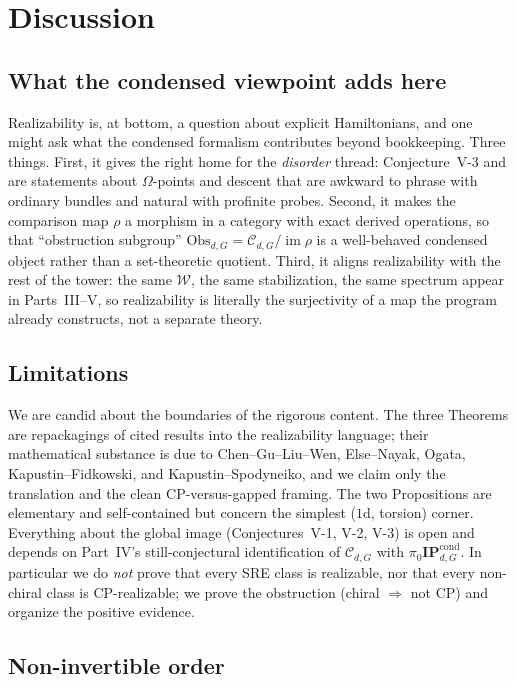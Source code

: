 \documentclass[12pt]{article}
\newcommand{\Weq}{\mathcal{W}}                 %
\newcommand{\IPcond}{\mathbf{IP}^{\mathrm{cond}}}  %
\newcommand{\dis}{\Omega}                       %
\newcommand{\real}{\rho}                         %
\newcommand{\CP}{\mathrm{CP}}                    %
\newcommand{\im}{\operatorname{im}}
\theoremstyle{definition}
\theoremstyle{remark}
\begin{document}
\section{Discussion}
\label{sec:discussion}

\subsection{What the condensed viewpoint adds here}

Realizability is, at bottom, a question about explicit Hamiltonians, and one might ask what
the condensed formalism contributes beyond bookkeeping. Three things. First, it gives the
right home for the \emph{disorder} thread: Conjecture~V-3 and  are
statements about $\dis$-points and descent that are awkward to phrase with ordinary bundles
and natural with profinite probes. Second, it makes the comparison map $\real$ a morphism in
a category with exact derived operations, so that ``obstruction subgroup''
$\mathrm{Obs}_{d,G}=\mathcal{C}_{d,G}/\im\real$ is a well-behaved condensed object rather
than a set-theoretic quotient. Third, it aligns realizability with the rest of the tower: the
same $\Weq$, the same stabilization, the same spectrum appear in Parts~III--V, so
realizability is literally the surjectivity of a map the program already constructs, not a
separate theory.

\subsection{Limitations}

We are candid about the boundaries of the rigorous content. The three Theorems are
repackagings of cited results into the realizability language; their mathematical substance
is due to Chen--Gu--Liu--Wen, Else--Nayak, Ogata, Kapustin--Fidkowski, and
Kapustin--Spodyneiko, and we claim only the translation and the clean $\CP$-versus-gapped
framing. The two Propositions are
elementary and self-contained but concern the simplest ($1$d, torsion) corner. Everything
about the global image (Conjectures~V-1, V-2, V-3) is open and depends on Part~IV's
still-conjectural identification of $\mathcal{C}_{d,G}$ with $\pi_0\IPcond_{d,G}$. In
particular we do \emph{not} prove that every SRE class is realizable, nor that every
non-chiral class is $\CP$-realizable; we prove the obstruction (chiral $\Rightarrow$ not
$\CP$) and organize the positive evidence.

\subsection{Non-invertible order}
\end{document}
